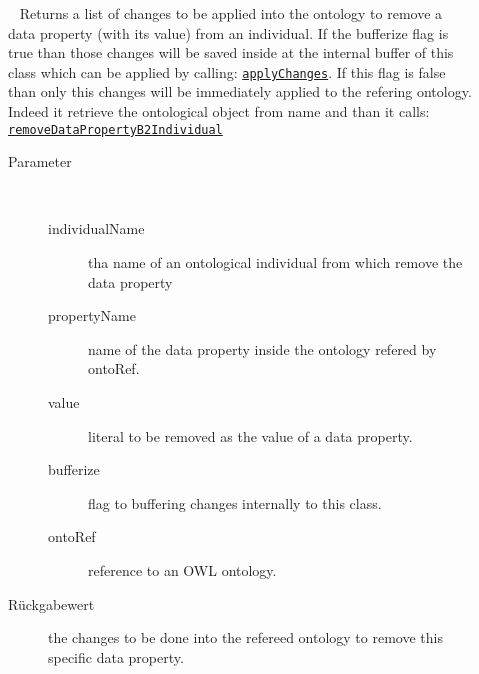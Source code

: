 \begin{description}
\item[{\label{ontologyFramework.OFContextManagement.OWLLibrary.removeDataPropertyB2Individual(java.lang.String,java.lang.String,java.lang.Object,boolean,ontologyFramework.OFContextManagement.OWLReferences)}}]
~ Returns a list of changes to be applied into the ontology to
 remove a data property (with its value) from an individual.
 If the bufferize flag is true than those changes will be saved inside at the
 internal buffer of this class which can be applied by calling:
 \texttt{\hyperlink{ontologyFramework.OFContextManagement.OWLLibrary.applyChanges(ontologyFramework.OFContextManagement.OWLReferences)}{applyChanges}}. If this flag is false than only this
 changes will be immediately applied to the refering ontology.
 Indeed it retrieve the ontological object from name and than it calls: 
 \texttt{\hyperlink{ontologyFramework.OFContextManagement.OWLLibrary.removeDataPropertyB2Individual(org.semanticweb.owlapi.model.OWLNamedIndividual,org.semanticweb.owlapi.model.OWLDataProperty,org.semanticweb.owlapi.model.OWLLiteral,boolean,ontologyFramework.OFContextManagement.OWLReferences)}{removeDataPropertyB2Individual}}
\begin{description}
\item[Parameter] ~
\begin{description}
\item[individualName]
tha name of an ontological individual from which remove the data property
\item[propertyName]
name of the data property inside the ontology refered by ontoRef.
\item[value]
literal to be removed as the value of a data property.
\item[bufferize]
flag to buffering changes internally to this class.
\item[ontoRef]
reference to an OWL ontology.
\end{description}
\item[Rückgabewert] 
the changes to be done into the refereed ontology to remove this specific data property.
\end{description}
\item[{\label{ontologyFramework.OFContextManagement.OWLLibrary.removeIndividualB2Class(org.semanticweb.owlapi.model.OWLNamedIndividual,org.semanticweb.owlapi.model.OWLClass,boolean,ontologyFramework.OFContextManagement.OWLReferences)}}]

\end{description}
